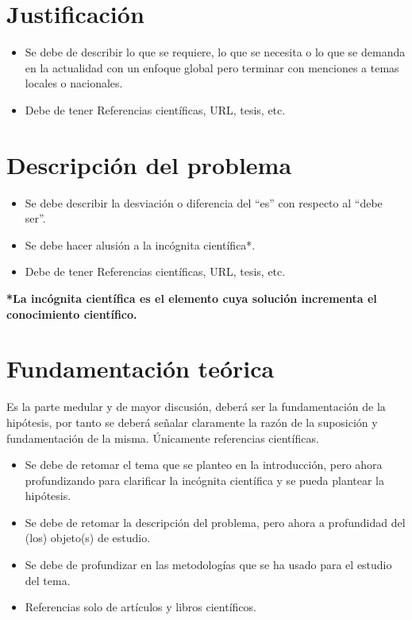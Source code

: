     \section{Justificación}
    
    \begin{itemize}
        \item Se debe de describir lo que se requiere, lo que se necesita o lo que se demanda en la actualidad con un enfoque global pero terminar con menciones a temas locales o nacionales.
        \item Debe de tener Referencias científicas, URL, tesis, etc.
    \end{itemize}
    \section{Descripción del problema}
    \begin{itemize}
        \item Se debe describir la desviación o diferencia del ``es'' con respecto al ``debe ser''.
        \item Se debe hacer alusión a la incógnita científica*.
        \item Debe de tener Referencias científicas, URL, tesis, etc.
    \end{itemize}
    
    \textbf{*La incógnita científica es el elemento cuya solución incrementa el conocimiento científico.}
    \section{Fundamentación teórica}
    
    Es la parte medular y de mayor discusión, deberá ser la fundamentación de la hipótesis, por tanto se deberá señalar claramente la razón de la suposición y fundamentación de la misma. Únicamente referencias científicas.
    \begin{itemize}
        \item Se debe de retomar el tema que se planteo en la introducción, pero ahora profundizando para clarificar la incógnita científica y se pueda plantear la hipótesis.
        \item Se debe de retomar la descripción del problema, pero ahora a profundidad del (los) objeto(s) de estudio. 
        \item Se debe de profundizar en las metodologías que se ha usado para el estudio del tema.
        \item Referencias solo de artículos y libros científicos.
    \end{itemize}
